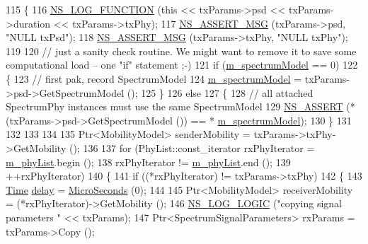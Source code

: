\begin{DoxyCode}
115 \{
116   \hyperlink{log-macros-disabled_8h_a90b90d5bad1f39cb1b64923ea94c0761}{NS\_LOG\_FUNCTION} (\textcolor{keyword}{this} << txParams->psd << txParams->duration << txParams->txPhy);
117   \hyperlink{assert_8h_aff5ece9066c74e681e74999856f08539}{NS\_ASSERT\_MSG} (txParams->psd, \textcolor{stringliteral}{"NULL txPsd"});
118   \hyperlink{assert_8h_aff5ece9066c74e681e74999856f08539}{NS\_ASSERT\_MSG} (txParams->txPhy, \textcolor{stringliteral}{"NULL txPhy"});
119 
120   \textcolor{comment}{// just a sanity check routine. We might want to remove it to save some computational load -- one "if"
       statement  ;-)}
121   \textcolor{keywordflow}{if} (\hyperlink{classns3_1_1SingleModelSpectrumChannel_a091b6ed95481cac790c42f20a8f4c429}{m\_spectrumModel} == 0)
122     \{
123       \textcolor{comment}{// first pak, record SpectrumModel}
124       \hyperlink{classns3_1_1SingleModelSpectrumChannel_a091b6ed95481cac790c42f20a8f4c429}{m\_spectrumModel} = txParams->psd->GetSpectrumModel ();
125     \}
126   \textcolor{keywordflow}{else}
127     \{
128       \textcolor{comment}{// all attached SpectrumPhy instances must use the same SpectrumModel}
129       \hyperlink{assert_8h_a6dccdb0de9b252f60088ce281c49d052}{NS\_ASSERT} (*(txParams->psd->GetSpectrumModel ()) == *
      \hyperlink{classns3_1_1SingleModelSpectrumChannel_a091b6ed95481cac790c42f20a8f4c429}{m\_spectrumModel});
130     \}
131 
132 
133 
134 
135   Ptr<MobilityModel> senderMobility = txParams->txPhy->GetMobility ();
136 
137   \textcolor{keywordflow}{for} (PhyList::const\_iterator rxPhyIterator = \hyperlink{classns3_1_1SingleModelSpectrumChannel_a119d78d112dab0990a78599a4f2e7a9e}{m\_phyList}.begin ();
138        rxPhyIterator != \hyperlink{classns3_1_1SingleModelSpectrumChannel_a119d78d112dab0990a78599a4f2e7a9e}{m\_phyList}.end ();
139        ++rxPhyIterator)
140     \{
141       \textcolor{keywordflow}{if} ((*rxPhyIterator) != txParams->txPhy)
142         \{
143           \hyperlink{namespacens3_1_1TracedValueCallback_a7ffd3e7c142ffe7c8a1d2db9b8de38ec}{Time} \hyperlink{lte_2model_2fading-traces_2fading__trace__generator_8m_a7964e6aa8f61a9d28973c8267a606ad8}{delay}  = \hyperlink{group__timecivil_ga17465a639c8d1464e76538afdd78a9f0}{MicroSeconds} (0);
144 
145           Ptr<MobilityModel> receiverMobility = (*rxPhyIterator)->GetMobility ();
146           \hyperlink{group__logging_ga88acd260151caf2db9c0fc84997f45ce}{NS\_LOG\_LOGIC} (\textcolor{stringliteral}{"copying signal parameters "} << txParams);
147           Ptr<SpectrumSignalParameters> rxParams = txParams->Copy ();

\end{DoxyCode}
